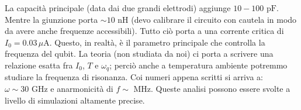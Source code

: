 La capacità principale (data dai due grandi elettrodi) aggiunge $10-100\text{ pF}$. Mentre la giunzione porta $\sim10 \text{ nH}$ (devo calibrare il circuito con cautela in modo da avere anche frequenze accessibili). Tutto ciò porta a una corrente critica di $I_0=0.03\, \mu \text{A}$.
Questo, in realtà, è il parametro principale che controlla la frequenza del qubit. La teoria (non studiata da noi) ci porta a scrivere una relazione esatta fra $I_0$, $T$ e $\omega_q$; perciò anche a temperatura ambiente potremmo studiare la frequenza di risonanza.
Coi numeri appena scritti si arriva a: $\omega\sim 30 \text{ GHz}$ e anarmonicità di $f\sim \text{ MHz}$.
Queste analisi possono essere svolte a livello di simulazioni altamente precise.
